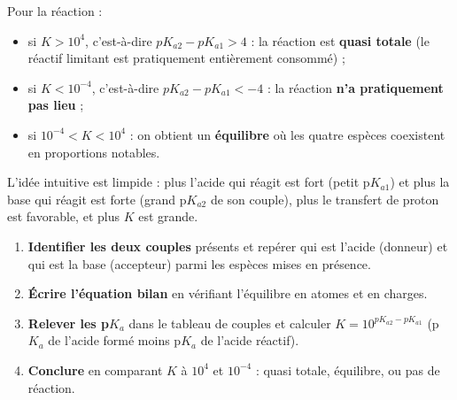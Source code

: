 \documentclass[11pt]{article}
\begin{document}
\begin{aretenir}
Pour la réaction  :
\begin{itemize}
\item si $K > 10^{4}$, c'est-à-dire $pK_{a2} - pK_{a1} > 4$ : la réaction est \textbf{quasi totale} (le réactif limitant est pratiquement entièrement consommé) ;
\item si $K < 10^{-4}$, c'est-à-dire $pK_{a2} - pK_{a1} < -4$ : la réaction \textbf{n'a pratiquement pas lieu} ;
\item si $10^{-4} < K < 10^{4}$ : on obtient un \textbf{équilibre} où les quatre espèces coexistent en proportions notables.
\end{itemize}
\end{aretenir}

L'idée intuitive est limpide : plus l'acide qui réagit est fort (petit p$K_{a1}$) et plus la base qui réagit est forte (grand p$K_{a2}$ de son couple), plus le transfert de proton est favorable, et plus $K$ est grande.

\begin{methode}
\begin{enumerate}
\item \textbf{Identifier les deux couples} présents et repérer qui est l'acide (donneur) et qui est la base (accepteur) parmi les espèces mises en présence.
\item \textbf{Écrire l'équation bilan}  en vérifiant l'équilibre en atomes et en charges.
\item \textbf{Relever les p$K_a$} dans le tableau de couples et calculer $K = 10^{pK_{a2} - pK_{a1}}$ (p$K_a$ de l'acide formé moins p$K_a$ de l'acide réactif).
\item \textbf{Conclure} en comparant $K$ à $10^{4}$ et $10^{-4}$ : quasi totale, équilibre, ou pas de réaction.
\end{enumerate}
\end{methode}
\end{document}
